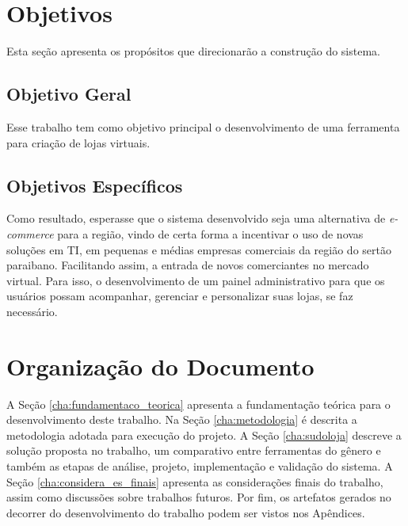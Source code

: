 \documentclass[a4paper,12pt]{monografia}
\begin{document}

\section{Objetivos} %
\label{sec:objetivos}

Esta seção apresenta os propósitos que direcionarão a construção do sistema.

\subsection{Objetivo Geral} %
\label{sub:objetivo_geral}

Esse trabalho tem como objetivo principal o desenvolvimento de uma ferramenta para criação de lojas virtuais.


\subsection{Objetivos Específicos} %
\label{sub:objetivos_espec}

Como resultado, esperasse que o sistema desenvolvido seja uma alternativa de \textit{e-commerce} para a região, vindo de certa forma a incentivar o uso de novas soluções em TI, em pequenas e médias empresas comerciais da região do sertão paraibano. Facilitando assim, a entrada de novos comerciantes no mercado virtual. Para isso, o desenvolvimento de um painel administrativo para que os usuários possam acompanhar, gerenciar e personalizar suas lojas, se faz necessário. 



\section{Organização do Documento} %
\label{sec:organizacao_do_documento}

A Seção \ref{cha:fundamentaco_teorica} apresenta a fundamentação teórica para o desenvolvimento deste trabalho. Na Seção \ref{cha:metodologia} é descrita a metodologia adotada para execução do projeto. A Seção \ref{cha:sudoloja} descreve a solução proposta no trabalho, um comparativo entre ferramentas do gênero e também as etapas de análise, projeto, implementação e validação do sistema. A Seção \ref{cha:considera_es_finais} apresenta as considerações finais do trabalho, assim como discussões sobre trabalhos futuros. Por fim, os artefatos gerados no decorrer do desenvolvimento do trabalho podem ser vistos nos Apêndices.
\end{document}

